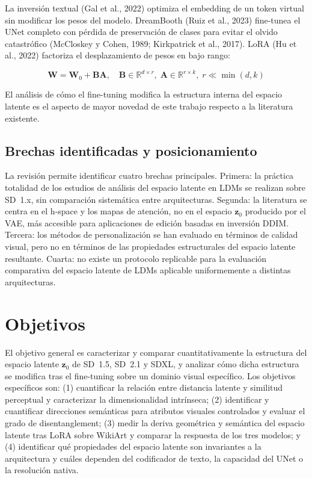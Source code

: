 \documentclass[12pt, a4paper, twoside]{book}
\newcommand{\z}{\mathbf{z}}
\newcommand{\R}{\mathbb{R}}
\begin{document}
La inversión textual (Gal et al., 2022) optimiza el embedding de un token virtual sin modificar los pesos del modelo. DreamBooth (Ruiz et al., 2023) fine-tunea el UNet completo con pérdida de preservación de clases para evitar el olvido catastrófico (McCloskey y Cohen, 1989; Kirkpatrick et al., 2017). LoRA (Hu et al., 2022) factoriza el desplazamiento de pesos en bajo rango:

\begin{equation}
\mathbf{W} = \mathbf{W}_0 + \mathbf{B}\mathbf{A},
\quad \mathbf{B} \in \R^{d \times r},\; \mathbf{A} \in \R^{r \times k},\; r \ll \min(d, k)
\end{equation}

El análisis de cómo el fine-tuning modifica la estructura interna del espacio latente es el aspecto de mayor novedad de este trabajo respecto a la literatura existente.

\subsection{Brechas identificadas y posicionamiento}

La revisión permite identificar cuatro brechas principales. Primera: la práctica totalidad de los estudios de análisis del espacio latente en LDMs se realizan sobre SD~1.x, sin comparación sistemática entre arquitecturas. Segunda: la literatura se centra en el h-space y los mapas de atención, no en el espacio $\z_0$ producido por el VAE, más accesible para aplicaciones de edición basadas en inversión DDIM. Tercera: los métodos de personalización se han evaluado en términos de calidad visual, pero no en términos de las propiedades estructurales del espacio latente resultante. Cuarta: no existe un protocolo replicable para la evaluación comparativa del espacio latente de LDMs aplicable uniformemente a distintas arquitecturas.

\section{Objetivos}
\label{sec:objetivos}

El objetivo general es caracterizar y comparar cuantitativamente la estructura del espacio latente $\z_0$ de SD~1.5, SD~2.1 y SDXL, y analizar cómo dicha estructura se modifica tras el fine-tuning sobre un dominio visual específico. Los objetivos específicos son: (1) cuantificar la relación entre distancia latente y similitud perceptual y caracterizar la dimensionalidad intrínseca; (2) identificar y cuantificar direcciones semánticas para atributos visuales controlados y evaluar el grado de disentanglement; (3) medir la deriva geométrica y semántica del espacio latente tras LoRA sobre WikiArt y comparar la respuesta de los tres modelos; y (4) identificar qué propiedades del espacio latente son invariantes a la arquitectura y cuáles dependen del codificador de texto, la capacidad del UNet o la resolución nativa.
\end{document}
